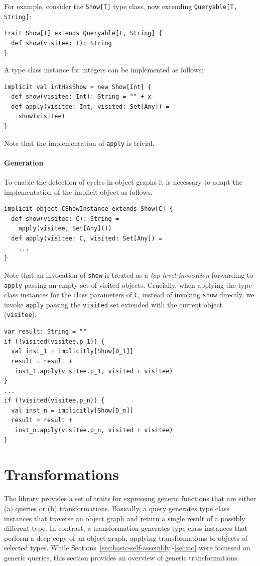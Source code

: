 \documentclass[preprint,nocopyrightspace]{sigplanconf}
\begin{document}
For example, consider the \verb|Show[T]| type class, now extending
\verb|Queryable[T, String]|:
\begin{lstlisting}
trait Show[T] extends Queryable[T, String] {
  def show(visitee: T): String
}
\end{lstlisting}
\noindent
A type class instance for integers can be implemented as follows:
\begin{lstlisting}
implicit val intHasShow = new Show[Int] {
  def show(visitee: Int): String = "" + x
  def apply(visitee: Int, visited: Set[Any]) =
    show(visitee)
}
\end{lstlisting}
\noindent
Note that the implementation of \verb|apply| is trivial.

\paragraph{Generation}

To enable the detection of cycles in object graphs it is necessary to
adapt the implementation of the implicit object as follows.

\begin{lstlisting}
implicit object CShowInstance extends Show[C] {
  def show(visitee: C): String =
    apply(visitee, Set[Any]())
  def apply(visitee: C, visited: Set[Any]) =
    ...
}
\end{lstlisting}
\noindent
Note that an invocation of \verb|show| is treated as a \emph{top-level
invocation} forwarding to \verb|apply| passing an empty set of visited
objects. Crucially, when applying the type class instances for the class
parameters of \verb|C|, instead of invoking \verb|show| directly, we invoke
\verb|apply| passing the \verb|visited| set extended with the current object
(\verb|visitee|).

\begin{lstlisting}
var result: String = ""
if (!visited(visitee.p_1)) {
  val inst_1 = implicitly[Show[D_1]]
  result = result +
   inst_1.apply(visitee.p_1, visited + visitee)
}
...
if (!visited(visitee.p_n)) {
  val inst_n = implicitly[Show[D_n]]
  result = result +
   inst_n.apply(visitee.p_n, visited + visitee)
}
\end{lstlisting}
\noindent


\section{Transformations}\label{sec:queries-transformations}

The library provides a set of traits for expressing generic functions that are
either (a) queries or (b) transformations. Basically, a query generates type
class instances that traverse an object graph and return a single result of a
possibly different type. In contrast, a transformation generates type class
instances that perform a deep copy of an object graph, applying
transformations to objects of selected types. While
Sections~\ref{sec:basic-self-assembly}-\ref{sec:oo} were focussed on generic
queries, this section provides an overview of generic transformations.
\end{document}
